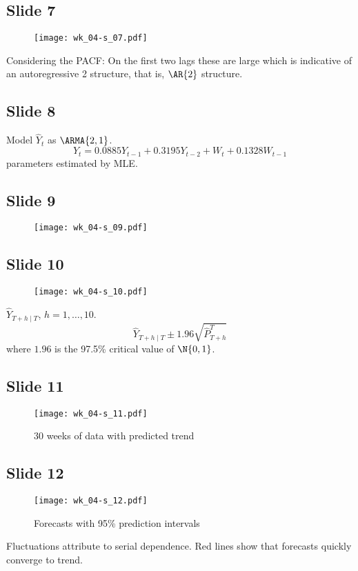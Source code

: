 \subsection*{Slide 7}
\begin{figure}[H]
    \centering
    \texttt{[image: wk\_04-s\_07.pdf]}
\end{figure}
Considering the PACF\@: On the first two lags these are large which
is indicative of an autoregressive 2 structure, that is, $ \AR{2} $
structure.

\subsection*{Slide 8}
Model $ \hat{Y}_{t} $ as $ \ARMA{2,1} $.
\[ Y_t=0.0885 Y_{t-1}+0.3195 Y_{t-2}+W_t +0.1328 W_{t-1} \]
parameters estimated by MLE\@.

\subsection*{Slide 9}
\begin{figure}[H]
    \centering
    \texttt{[image: wk\_04-s\_09.pdf]}
\end{figure}

\subsection*{Slide 10}
\begin{figure}[H]
    \centering
    \texttt{[image: wk\_04-s\_10.pdf]}
\end{figure}
$ \hat{Y}_{T+h\mid T} $, $ h=1,\ldots,10 $.
\[ \hat{Y}_{T+h\mid T}\pm 1.96\sqrt{\hat{P}_{T+h}^T} \]
where $ 1.96 $ is the 97.5\% critical value of $ \N{0,1} $.

\subsection*{Slide 11}
\begin{figure}[H]
    \centering
    \texttt{[image: wk\_04-s\_11.pdf]}
    \caption{30 weeks of data with predicted trend}
\end{figure}

\subsection*{Slide 12}
\begin{figure}[H]
    \centering
    \texttt{[image: wk\_04-s\_12.pdf]}
    \caption{Forecasts with 95\% prediction intervals}
\end{figure}
Fluctuations attribute to serial dependence. Red lines
show that forecasts quickly converge to trend.

